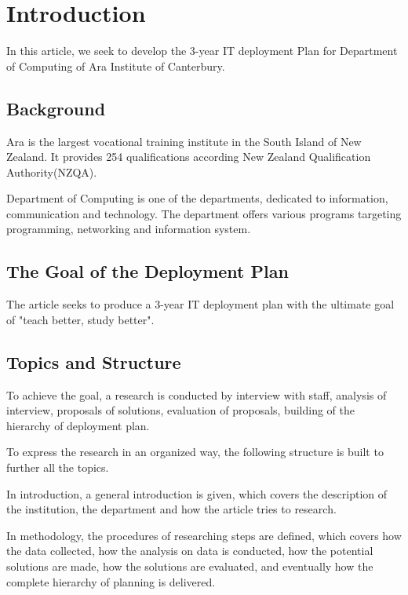 
\section{Introduction}

In this article, we seek to develop the 3-year IT deployment Plan for Department of Computing of Ara Institute of Canterbury.

\subsection{Background}
Ara is the largest vocational training institute in the South Island of New Zealand. It provides 254 qualifications according New Zealand Qualification Authority(NZQA).

Department of Computing is one of the departments, dedicated to information, communication and technology. The department offers various programs targeting programming, networking and information system.


\subsection{The Goal of the Deployment Plan}
The article seeks to produce a 3-year IT deployment plan with the ultimate goal of "teach better, study better".


\subsection{Topics and Structure}
To achieve the goal, a research is conducted by interview with staff, analysis of interview, proposals of solutions, evaluation of proposals, building of the hierarchy of deployment plan.

To express the research in an organized way, the following structure is built to further all the topics.

In introduction, a general introduction is given, which covers the description of the institution, the department and how the article tries to research.

In methodology, the procedures of researching steps are defined, which covers how the data collected, how the analysis on data is conducted, how the potential solutions are made, how the solutions are evaluated, and eventually how the complete hierarchy of planning is delivered.

